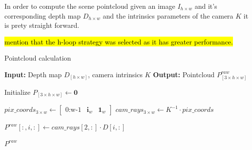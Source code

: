 In order to compute the scene pointcloud given an image $I_{h \times w}$ and it's corresponding depth map $D_{h \times w}$ and the intrinsics parameters of the camera $K$ it is prety straight forward. 

\hl{mention that the h-loop strategy was selected as it has greater performance.}

\begin{algorithm}
    \caption{Pointcloud calculation}
    \label{algorithm:scene_pcd_hloop}
    \footnotesize

    \begin{algorithmic}[1]
        \State \textbf{Input:} Depth map $D_{\left[h \times w\right]}$, camera intrinsics $K$ 
        \State \textbf{Output:} Pointcloud $P^{raw}_{\left[3 \times h \times w\right]}$
        
        \State Initialize $P_{\left[3 \times h \times w\right]} \gets \mathbf{0}$

            \State $pix\_coords_{3 \times w} \gets \begin{bmatrix} \text{0:w-1} & \mathbf{i}_w & \mathbf{1}_w \end{bmatrix}$
            \State $cam\_rays_{3 \times w} \gets K^{-1} \cdot pix\_coords$
            
            \State $P^{raw}[:, i, :] \gets cam\_rays[2, :] \cdot D[i, :]$  
        \EndFor
        
        \State \Return $P^{raw}$
    \end{algorithmic}
\end{algorithm}

